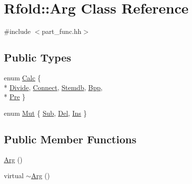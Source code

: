 \hypertarget{class_rfold_1_1_arg}{\section{Rfold\+:\+:Arg Class Reference}
\label{class_rfold_1_1_arg}
}


{\ttfamily \#include $<$part\+\_\+func.\+hh$>$}

\subsection*{Public Types}
\begin{DoxyCompactItemize}
\item 
enum \hyperlink{class_rfold_1_1_arg_a1ba8526c9dde5121ae798c609db48801}{Calc} \{ \\*
\hyperlink{class_rfold_1_1_arg_a1ba8526c9dde5121ae798c609db48801ac6c7848d19c2a3e0fd8a3f0ad26cf0a0}{Divide}, 
\hyperlink{class_rfold_1_1_arg_a1ba8526c9dde5121ae798c609db48801af08125fc4144dd18a8c8198c875de7d8}{Connect}, 
\hyperlink{class_rfold_1_1_arg_a1ba8526c9dde5121ae798c609db48801a7383358c5f476a70216b917ea0770f59}{Stemdb}, 
\hyperlink{class_rfold_1_1_arg_a1ba8526c9dde5121ae798c609db48801aae55731f0f2e94aaa89a89aaef36fa4f}{Bpp}, 
\\*
\hyperlink{class_rfold_1_1_arg_a1ba8526c9dde5121ae798c609db48801af660c6b3162264221e2fe989794998ca}{Pre}
 \}
\item 
enum \hyperlink{class_rfold_1_1_arg_a83e373e1c4c710d314bcf7fe1e53db81}{Mut} \{ \hyperlink{class_rfold_1_1_arg_a83e373e1c4c710d314bcf7fe1e53db81a00d32bd79ae4bbeedd485a960afac497}{Sub}, 
\hyperlink{class_rfold_1_1_arg_a83e373e1c4c710d314bcf7fe1e53db81a91868e8431ff35f7ea634fd2ae7f8247}{Del}, 
\hyperlink{class_rfold_1_1_arg_a83e373e1c4c710d314bcf7fe1e53db81a4bfd8907a032f8d6845a0539dee06185}{Ins}
 \}
\end{DoxyCompactItemize}
\subsection*{Public Member Functions}
\begin{DoxyCompactItemize}
\item 
\hyperlink{class_rfold_1_1_arg_ad5964eb7a943585d47a7a4745133e198}{Arg} ()
\item 
virtual \hyperlink{class_rfold_1_1_arg_a5393c57599fe8de9a51b9dba632546b1}{$\sim$\+Arg} ()
\end{DoxyCompactItemize}
